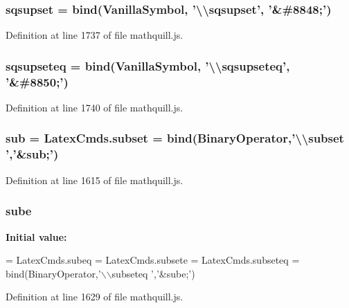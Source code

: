 \subsubsection[{sqsupset}]{ sqsupset = {\bf bind}({\bf Vanilla\-Symbol}, '\textbackslash{}\textbackslash{}sqsupset', '\&\#8848;')}\label{mathquill_8js_a436b734a42d4a36802c8cdd364d4080a}


Definition at line 1737 of file mathquill.\-js.

\subsubsection[{sqsupseteq}]{ sqsupseteq = {\bf bind}({\bf Vanilla\-Symbol}, '\textbackslash{}\textbackslash{}sqsupseteq', '\&\#8850;')}\label{mathquill_8js_a6a4576dbbdcda1a8d97b8f05304a698c}


Definition at line 1740 of file mathquill.\-js.

\subsubsection[{sub}]{ sub = Latex\-Cmds.\-subset = {\bf bind}({\bf Binary\-Operator},'\textbackslash{}\textbackslash{}subset ','\&sub;')}\label{mathquill_8js_ad9edb82c135b4606f1000cd5b6ee419e}


Definition at line 1615 of file mathquill.\-js.

\subsubsection[{sube}]{ sube}\label{mathquill_8js_ad353cee68c7689382a99c3ef1e471cb1}
{\bfseries Initial value\-:}
\begin{DoxyCode}
= LatexCmds.subeq = LatexCmds.subsete = LatexCmds.subseteq =
  bind(BinaryOperator,\textcolor{stringliteral}{'\(\backslash\)\(\backslash\)subseteq '},\textcolor{stringliteral}{'&sube;'})
\end{DoxyCode}


Definition at line 1629 of file mathquill.\-js.

